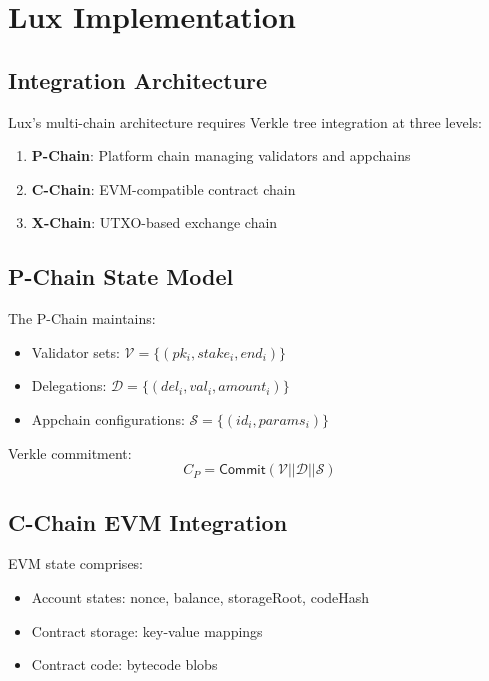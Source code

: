 \section{Lux Implementation}


\subsection{Integration Architecture}

Lux's multi-chain architecture requires Verkle tree integration at three levels:

\begin{enumerate}
    \item \textbf{P-Chain}: Platform chain managing validators and appchains
    \item \textbf{C-Chain}: EVM-compatible contract chain
    \item \textbf{X-Chain}: UTXO-based exchange chain
\end{enumerate}

\subsection{P-Chain State Model}

The P-Chain maintains:
\begin{itemize}
    \item Validator sets: $\mathcal{V} = \{(pk_i, stake_i, end_i)\}$
    \item Delegations: $\mathcal{D} = \{(del_i, val_i, amount_i)\}$
    \item Appchain configurations: $\mathcal{S} = \{(id_i, params_i)\}$
\end{itemize}

Verkle commitment:
\begin{equation}
    C_{P} = \mathsf{Commit}(\mathcal{V} || \mathcal{D} || \mathcal{S})
\end{equation}

\subsection{C-Chain EVM Integration}

EVM state comprises:
\begin{itemize}
    \item Account states: nonce, balance, storageRoot, codeHash
    \item Contract storage: key-value mappings
    \item Contract code: bytecode blobs
\end{itemize}

